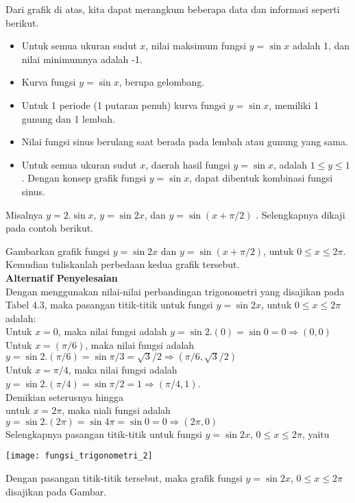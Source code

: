 \documentclass[11pt,fleqn]{book} %
\begin{document}
\begin{myEnumerate}
\begin{itemize}
\begin{enumerate}
Dari grafik di atas,  kita dapat merangkum beberapa data dan informasi seperti berikut.
\begin{itemize}
\item Untuk semua ukuran sudut $x$,  nilai maksimum fungsi $y = \sin x$ adalah 1, dan nilai minimumnya adalah -1.
\item Kurva fungsi $y = \sin x$, berupa gelombang.
\item Untuk 1 periode (1 putaran penuh) kurva fungsi $y = \sin x$, memiliki 1 gunung dan 1 lembah.
\item Nilai fungsi sinus berulang saat berada pada lembah atau gunung yang sama.
\item Untuk semua ukuran sudut $x$, daerah hasil fungsi $y = \sin x$, adalah $1 \leq y \leq 1$. Dengan konsep grafik fungsi $y = \sin x$, dapat dibentuk kombinasi fungsi sinus.
\end{itemize}

Misalnya $y = 2.\sin x$, $y = \sin 2x$, dan $y = \sin (x+\pi/2)$ . Selengkapnya dikaji pada contoh berikut.

\begin{example}
Gambarkan grafik fungsi $y = \sin 2x$ dan $y = \sin (x+\pi/2)$, untuk $0 \leq x\leq 2\pi$. Kemudian tuliskanlah perbedaan kedua grafik tersebut.\\

\textbf{Alternatif Penyelesaian}\\
Dengan menggunakan nilai-nilai perbandingan trigonometri yang disajikan pada Tabel 4.3, maka pasangan titik-titik untuk fungsi $y = \sin 2x$, untuk $0 \leq x\leq 2\pi$ adalah:\\
Untuk $x = 0$, maka nilai fungsi adalah $y = \sin 2.(0) = \sin 0 = 0 \Rightarrow (0, 0)$\\
Untuk $x = (\pi/6)$, maka nilai fungsi adalah $y = \sin 2. (\pi/6) = \sin \pi/3 = \sqrt{3}/2 \Rightarrow(\pi/6,\sqrt{3}/2)$\\
Untuk $x = \pi/4$, maka nilai fungsi adalah $y = \sin 2. (\pi/4) = \sin \pi/2 = 1 \Rightarrow(\pi/4,1)$.\\
Demikian seterusnya hingga\\
untuk $x = 2\pi$, maka niali fungsi adalah $y = \sin 2.(2\pi) = \sin 4\pi = \sin 0 = 0 \Rightarrow (2\pi, 0)$\\
Selengkapnya pasangan titik-titik untuk fungsi $y = \sin 2x$, $0 \leq x\leq 2\pi$, yaitu

\texttt{[image: fungsi\_trigonometri\_2]}

Dengan  pasangan titik-titik tersebut, maka grafik fungsi $y = \sin 2x$, $0 \leq x\leq 2\pi$ disajikan pada Gambar.\\


\end{example}
\end{enumerate}
\end{itemize}
\end{myEnumerate}
\end{document}
